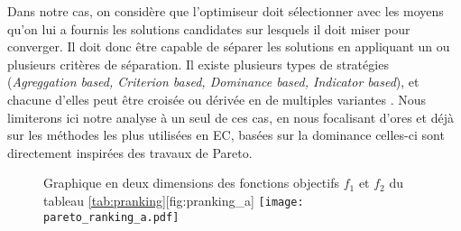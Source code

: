 Dans notre cas, on considère que l'optimiseur doit sélectionner avec les moyens qu'on lui a fournis les solutions candidates sur lesquels il doit miser pour converger. Il doit donc être capable de séparer les solutions en appliquant un ou plusieurs critères de séparation. Il existe plusieurs types de stratégies (\textit{Agreggation based, Criterion based, Dominance based, Indicator based}), et chacune d'elles peut être croisée ou dérivée en de multiples variantes \autocites[28]{Zitzler1999a, Deb2001}[7]{Liefooghe2009}. Nous limiterons ici notre analyse à un seul de ces cas, en nous focalisant d'ores et déjà sur les méthodes les plus utilisées en EC, basées sur la dominance celles-ci sont directement inspirées des travaux de Pareto.


\begin{figure}[!htbp]
	\begin{sidecaption}[fortoc]{Graphique en deux dimensions des fonctions objectifs $f_1$ et $f_2$ du tableau \ref{tab:pranking}}[fig:pranking_a]
		\centering
		\texttt{[image: pareto\_ranking\_a.pdf]}
	 \end{sidecaption}
\end{figure}


